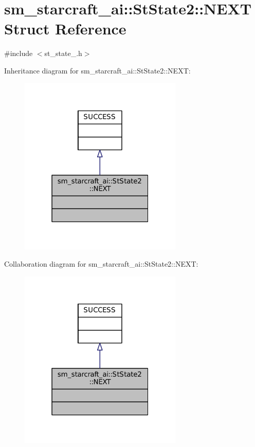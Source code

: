 \hypertarget{structsm__starcraft__ai_1_1StState2_1_1NEXT}{}\section{sm\+\_\+starcraft\+\_\+ai\+:\+:St\+State2\+:\+:N\+E\+XT Struct Reference}
\label{structsm__starcraft__ai_1_1StState2_1_1NEXT}


{\ttfamily \#include $<$st\+\_\+state\+\_.\+h$>$}



Inheritance diagram for sm\+\_\+starcraft\+\_\+ai\+:\+:St\+State2\+:\+:N\+E\+XT\+:
\nopagebreak
\begin{figure}[H]
\begin{center}
\leavevmode
\includegraphics[width=220pt]{structsm__starcraft__ai_1_1StState2_1_1NEXT__inherit__graph}
\end{center}
\end{figure}


Collaboration diagram for sm\+\_\+starcraft\+\_\+ai\+:\+:St\+State2\+:\+:N\+E\+XT\+:
\nopagebreak
\begin{figure}[H]
\begin{center}
\leavevmode
\includegraphics[width=220pt]{structsm__starcraft__ai_1_1StState2_1_1NEXT__coll__graph}
\end{center}
\end{figure}


